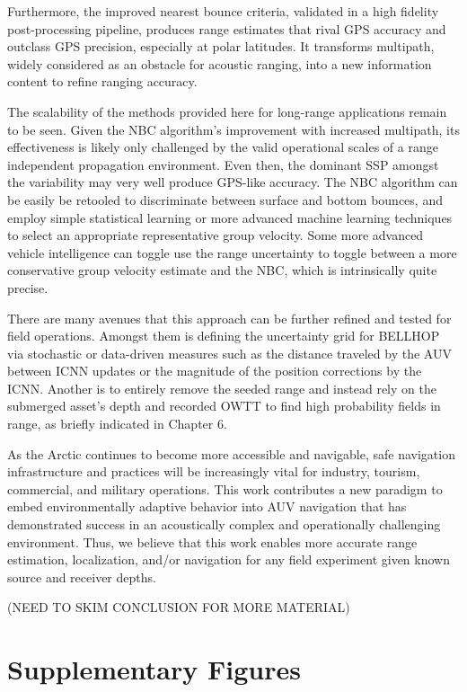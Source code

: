 Furthermore, the improved nearest bounce criteria, validated in a high fidelity post-processing pipeline, produces range estimates that rival GPS accuracy and outclass GPS precision, especially at polar latitudes.
It transforms multipath, widely considered as an obstacle for acoustic ranging, into a new information content to refine ranging accuracy.

The scalability of the methods provided here for long-range applications remain to be seen.
Given the NBC algorithm's improvement with increased multipath, its effectiveness is likely only challenged by the valid operational scales of a range independent propagation environment.
Even then, the dominant SSP amongst the variability may very well produce GPS-like accuracy.
The NBC algorithm can be easily be retooled to discriminate between surface and bottom bounces, and employ simple statistical learning or more advanced machine learning techniques to select an appropriate representative group velocity.
Some more advanced vehicle intelligence can toggle use the range uncertainty to toggle between a more conservative group velocity estimate and the NBC, which is intrinsically quite precise.

There are many avenues that this approach can be further refined and tested for field operations.
Amongst them is defining the uncertainty grid for BELLHOP via stochastic or data-driven measures such as the distance traveled by the AUV between ICNN updates or the magnitude of the position corrections by the ICNN.
Another is to entirely remove the seeded range and instead rely on the submerged asset's depth and recorded OWTT to find high probability fields in range, as briefly indicated in Chapter 6.

As the Arctic continues to become more accessible and navigable, safe navigation infrastructure and practices will be increasingly vital for industry, tourism, commercial, and military operations.
This work contributes a new paradigm to embed environmentally adaptive behavior into AUV navigation that has demonstrated success in an acoustically complex and operationally challenging environment.
Thus, we believe that this work enables more accurate range estimation, localization, and/or navigation for any field experiment given known source and receiver depths.

(NEED TO SKIM CONCLUSION FOR MORE MATERIAL)

\clearpage
\section*{Supplementary Figures}

